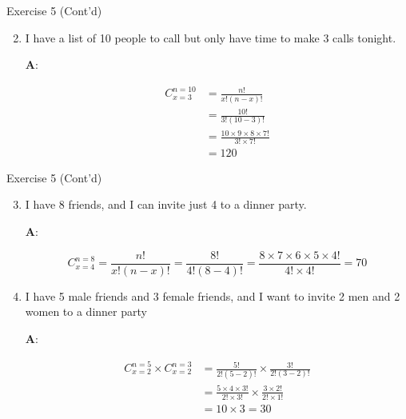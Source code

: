 \documentclass[
  ignorenonframetext,
  aspectratio=43,
]{beamer}
\let\olditem\item
\renewcommand\item{\olditem\justifying}
\begin{document}
\begin{frame}{Exercise 5 (Cont'd)}
\protect\hypertarget{exercise-5-contd}{}
\begin{enumerate}
\setcounter{enumi}{1}
\item
  I have a list of 10 people to call but only have time to make 3 calls
  tonight.

  \pause

  \textbf{A}: \vspace{-10pt}

  \[
  \begin{aligned}
  C_{x=3}^{n=10} &= \frac{n!}{x!(n - x)!} \\
  &= \frac{10!}{3!(10 - 3)!} \\
  &= \frac{10 \times 9 \times 8 \times 7!}{3! \times 7!} \\
  &= 120
  \end{aligned}
  \]
\end{enumerate}
\end{frame}

\begin{frame}{Exercise 5 (Cont'd)}
\protect\hypertarget{exercise-5-contd-1}{}
\begin{enumerate}
\setcounter{enumi}{2}
\item
  I have 8 friends, and I can invite just 4 to a dinner party.

  \pause

  \textbf{A}: \vspace{-20pt}

  \[
  C_{x=4}^{n=8} = \frac{n!}{x!(n - x)!} 
  = \frac{8!}{4!(8 - 4)!} 
  = \frac{8 \times 7 \times 6 \times 5 \times 4!}{4! \times 4!} 
  = 70
  \]
\item
  I have 5 male friends and 3 female friends, and I want to invite 2 men
  and 2 women to a dinner party

  \pause

  \textbf{A}: \vspace{-10pt}

  \[
  \begin{aligned}
  C_{x=2}^{n=5} \times C_{x=2}^{n=3} &= \frac{5!}{2!(5 - 2)!} \times \frac{3!}{2!(3 - 2)!} \\
  &= \frac{5 \times 4 \times 3!}{2! \times 3!} \times \frac{3 \times 2!}{2! \times 1!} \\
  &= 10 \times 3 = 30
  \end{aligned}
  \]
\end{enumerate}
\end{frame}
\end{document}
